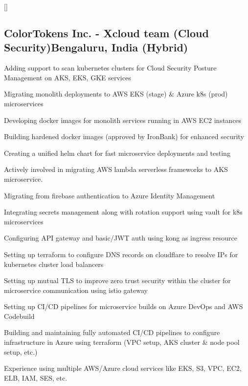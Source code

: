 \documentclass[letter,10pt]{article}
\begin{document}
\titlespacing*{\subsubsection}{0em}{0em}{0em}
\titleformat{\subsubsection}{\itshape}{}{0em}{}[]


\subsection{ColorTokens Inc. - Xcloud team (Cloud Security)\hfill Bengaluru, India (Hybrid)}
\begin{zitemize}
\item Adding support to scan kubernetes clusters for Cloud Security Posture Management on AKS, EKS, GKE services
\item Migrating monolith deployments to AWS EKS (stage) \& Azure k8s (prod) microservices
\item Developing docker images for monolith services running in AWS EC2 instances
\item Building hardened docker images (approved by IronBank) for enhanced security
\item Creating a unified helm chart for fast microservice deployments and testing
\item Actively involved in migrating AWS lambda serverless frameworks to AKS microservice.
\item Migrating from firebase authentication to Azure Identity Management
\item Integrating secrets management along with rotation support using vault for k8s microservices
\item Configuring API gateway and basic/JWT auth using kong as ingress resource
\item Setting up terraform to configure DNS records on cloudflare to resolve IPs for kubernetes cluster load balancers
\item Setting up mutual TLS to improve zero trust security within the cluster for microservice communication using istio gateway
\item Setting up CI/CD pipelines for microservice builds on Azure DevOps and AWS Codebuild
\item Building and maintaining fully automated CI/CD pipelines to configure infrastructure in Azure using terraform (VPC setup, AKS cluster \& node pool setup, etc.)
\item Experience using multiple AWS/Azure cloud services like EKS, S3, VPC, EC2, ELB, IAM, SES, etc.
\end{zitemize}
\end{document}
